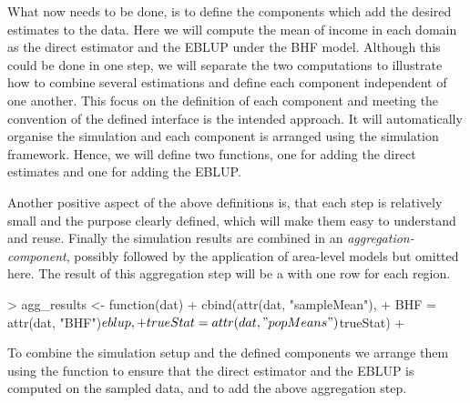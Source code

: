 \documentclass[article]{ajs}
\begin{document}
What now needs to be done, is to define the components which add the desired estimates to the data. Here we will compute the mean of income in each domain as the direct estimator and the EBLUP under the BHF model. Although this could be done in one step, we will separate the two computations to illustrate how to combine several estimations and define each component independent of one another. This focus on the definition of each component and meeting the convention of the defined interface is the intended approach. It will automatically organise the simulation and each component is arranged using the simulation framework. Hence, we will define two functions, one for adding the direct estimates and one for adding the EBLUP.

\begin{Schunk}
\end{Schunk}

Another positive aspect of the above definitions is, that each step is relatively small and the purpose clearly defined, which will make them easy to understand and reuse. Finally the simulation results are combined in an \textit{aggregation-component}, possibly followed by the application of area-level models but omitted here. The result of this aggregation step will be a  with one row for each region.

\begin{Schunk}
\begin{Sinput}
> agg_results <- function(dat) {
+   cbind(attr(dat, "sampleMean"),
+         BHF = attr(dat, "BHF")$eblup,
+         trueStat = attr(dat, "popMeans")$trueStat)
+ }
\end{Sinput}
\end{Schunk}

To combine the simulation setup and the defined components we arrange them using the function  to ensure that the direct estimator and the EBLUP is computed on the sampled data, and  to add the above aggregation step.
\end{document}
